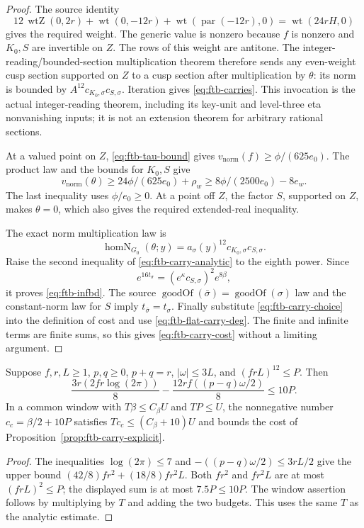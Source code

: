\begin{proof}
The source identity
\[
 12\,\operatorname{wtZ}(0,2r)
  +\operatorname{wt}(0,-12r)
  +\operatorname{wt}(\operatorname{par}(-12r),0)
       =\operatorname{wt}(24rH,0)
\]
gives the required weight.  The generic value is nonzero because
\(f\) is nonzero and \(K_0,S\) are invertible on \(Z\).
The rows of this weight are antitone.
The integer-reading/bounded-section multiplication theorem therefore
sends any even-weight cusp section supported on \(Z\) to a cusp
section after multiplication by \(\theta\): its norm is bounded by
\(A^{12}c_{K_0,\sigma}c_{S,\sigma}\).
Iteration gives \eqref{eq:ftb-carries}.  This invocation is the actual
integer-reading theorem, including its key-unit and level-three eta
nonvanishing inputs; it is not an extension theorem for arbitrary
rational sections.

At a valued point on \(Z\), \eqref{eq:ftb-tau-bound} gives
\(v_{\mathrm{norm}}(f)\geq\phi/(625e_0)\).
The product law and the bounds for \(K_0,S\) give
\[
 v_{\mathrm{norm}}(\theta)
     \geq24\phi/(625e_0)+\rho_w
     \geq8\phi/(2500e_0)-8e_w .
\]
The last inequality uses \(\phi/e_0\geq0\).
At a point off \(Z\), the factor \(S\), supported on \(Z\), makes
\(\theta=0\), which also gives the required extended-real inequality.

The exact norm multiplication law is
\[
 \operatorname{homN}_{G_0}(\theta;y)
       =a_\sigma(y)^{12}c_{K_0,\sigma}c_{S,\sigma}.
\]
Raise the second inequality of \eqref{eq:ftb-carry-analytic} to
the eighth power.  Since
\[
 e^{16t_\sigma}
       =(e^\kappa c_{S,\sigma})^2e^{8\beta},
\]
it proves \eqref{eq:ftb-infbd}.  The source
\(\operatorname{goodOf}(\bar\sigma)=\operatorname{goodOf}(\sigma)\)
law and the constant-norm law for \(S\) imply
\(t_{\bar\sigma}=t_\sigma\).  Finally substitute
\eqref{eq:ftb-carry-choice} into the definition of cost and use
\eqref{eq:ftb-flat-carry-deg}.  The finite and infinite terms are
finite sums, so this gives \eqref{eq:ftb-carry-cost} without a
limiting argument.
\end{proof}

\begin{srlemma}\label{lem:ftb-carry-cost-numerical}
Suppose \(f,r,L\geq1\), \(p,q\geq0\), \(p+q=r\),
\(|\omega|\leq3L\), and \((frL)^{12}\leq P\).
Then
\[
 \frac{3r(2fr\log(2\pi))}{8}
 -\frac{12rf((p-q)\omega/2)}8\leq10P.
\]
In a common window with \(T\beta\leq C_\beta U\) and \(TP\leq U\),
the nonnegative number \(c_c=\beta/2+10P\) satisfies
\(Tc_c\leq(C_\beta+10)U\) and bounds the cost of
Proposition~\ref{prop:ftb-carry-explicit}.
\end{srlemma}
\begin{proof}
The inequalities \(\log(2\pi)\leq7\) and
\(-((p-q)\omega/2)\leq3rL/2\) give the upper bound
\((42/8)fr^2+(18/8)fr^2L\).
Both \(fr^2\) and \(fr^2L\) are at most \((frL)^2\leq P\);
the displayed sum is at most \(7.5P\leq10P\).
The window assertion follows by multiplying by \(T\) and adding
the two budgets.  This uses the same \(T\) as the analytic estimate.
\end{proof}

